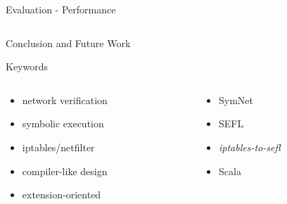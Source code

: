 \documentclass{beamer}
\begin{document}
\begin{frame}{Evaluation - Performance}
\begin{columns}
\begin{column}{.5\textwidth}
  \end{column}
\end{columns}
\end{frame}

\begin{frame}{Conclusion and Future Work}
\end{frame}

\begin{frame}{Keywords}
\begin{columns}
  \begin{column}{0.5\textwidth}
    \centering
    \begin{itemize}
      \item network verification
      \item symbolic execution
      \item iptables/netfilter
      \item compiler-like design
      \item extension-oriented
    \end{itemize}
  \end{column}
  \begin{column}{0.5\textwidth}
    \centering
    \begin{itemize}
      \item SymNet
      \item SEFL
      \item \emph{iptables-to-sefl}
      \item Scala
    \end{itemize}
  \end{column}
\end{columns}
\end{frame}
\end{document}

